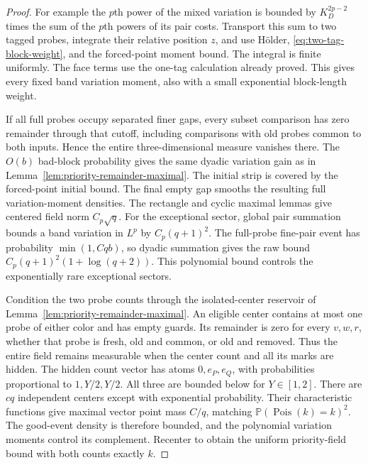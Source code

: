 \documentclass[11pt,letterpaper]{article}
\newcommand{\PP}{\mathbb P}\newcommand{\EE}{\mathbb E}
\begin{document}
\begin{proof}
For example the $p$th power of the mixed variation is
bounded by $K_D^{2p-2}$ times the sum of the $p$th powers
of its pair costs. Transport this sum to two tagged probes,
integrate their relative position $z$, and use H\"older,
\eqref{eq:two-tag-block-weight}, and the forced-point moment
bound. The integral is finite uniformly. The face terms
use the one-tag calculation already proved.
This gives every fixed band variation moment, also with
a small exponential block-length weight.

If all full probes occupy separated finer gaps, every
subset comparison has zero remainder through that cutoff,
including comparisons with old probes common to both inputs.
Hence the entire three-dimensional measure vanishes there.
The $O(b)$ bad-block probability gives the same dyadic
variation gain as in Lemma~\ref{lem:priority-remainder-maximal}.
The initial strip is covered by the forced-point initial
bound. The final empty gap smooths the resulting full
variation-moment densities. The rectangle and cyclic maximal
lemmas give centered field norm $C_p\sqrt q$.
For the exceptional sector, global pair summation bounds a
band variation in $L^p$ by $C_p(q+1)^2$.
The full-probe fine-pair event has probability
$\min(1,Cqb)$, so dyadic summation gives the raw bound
$C_p(q+1)^2(1+\log(q+2))$. This polynomial bound controls
the exponentially rare exceptional sectors.

Condition the two probe counts through the isolated-center
reservoir of Lemma~\ref{lem:priority-remainder-maximal}.
An eligible center contains at most one probe of either
color and has empty guards. Its remainder is zero for
every $v,w,r$, whether that probe is fresh, old and common,
or old and removed. Thus the entire field remains measurable
when the center count and all its marks are hidden.
The hidden count vector has atoms $0,e_P,e_Q$, with probabilities
proportional to $1,Y/2,Y/2$. All three are bounded below
for $Y\in[1,2]$.
There are $cq$ independent centers except with exponential
probability. Their characteristic functions give maximal
vector point mass $C/q$, matching
$\PP(\operatorname{Pois}(k)=k)^2$.
The good-event density is therefore bounded, and the
polynomial variation moments control its complement.
Recenter to obtain the uniform priority-field bound with
both counts exactly $k$.


\end{proof}
\end{document}
